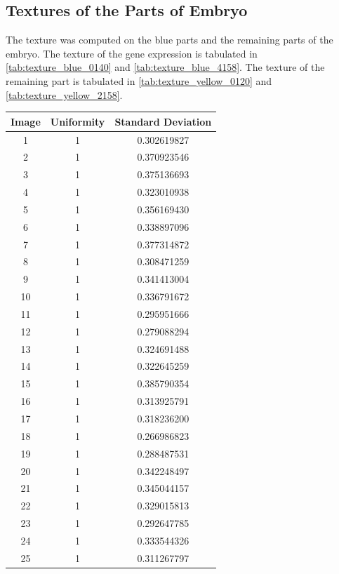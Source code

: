 \documentclass{article}
\begin{document}
\subsection*{Textures of the Parts of Embryo}
The texture was computed on the blue parts and the remaining parts of the embryo. 
The texture of the gene expression is tabulated in \ref{tab:texture_blue_0140} and \ref{tab:texture_blue_4158}. The texture of the remaining part is tabulated in \ref{tab:texture_yellow_0120} and \ref{tab:texture_yellow_2158}. 
\begin{table}[h!]
    \centering
    \begin{tabular}{|c|c|c|}
    \hline
    Image & Uniformity & Standard Deviation \\ \hline
    1 & 1 & 0.302619827 \\ \hline
    2 & 1 & 0.370923546 \\ \hline
    3 & 1 & 0.375136693 \\ \hline
    4 & 1 & 0.323010938 \\ \hline
    5 & 1 & 0.356169430 \\ \hline
    6 & 1 & 0.338897096 \\ \hline
    7 & 1 & 0.377314872 \\ \hline
    8 & 1 & 0.308471259 \\ \hline
    9 & 1 & 0.341413004 \\ \hline
    10 & 1 & 0.336791672 \\ \hline
    11 & 1 & 0.295951666 \\ \hline
    12 & 1 & 0.279088294 \\ \hline
    13 & 1 & 0.324691488 \\ \hline
    14 & 1 & 0.322645259 \\ \hline
    15 & 1 & 0.385790354 \\ \hline
    16 & 1 & 0.313925791 \\ \hline
    17 & 1 & 0.318236200 \\ \hline
    18 & 1 & 0.266986823 \\ \hline
    19 & 1 & 0.288487531 \\ \hline
    20 & 1 & 0.342248497 \\ \hline
    21 & 1 & 0.345044157 \\ \hline
    22 & 1 & 0.329015813 \\ \hline
    23 & 1 & 0.292647785 \\ \hline
    24 & 1 & 0.333544326 \\ \hline
    25 & 1 & 0.311267797 \\ \hline

\end{tabular}
\end{table}
\end{document}
